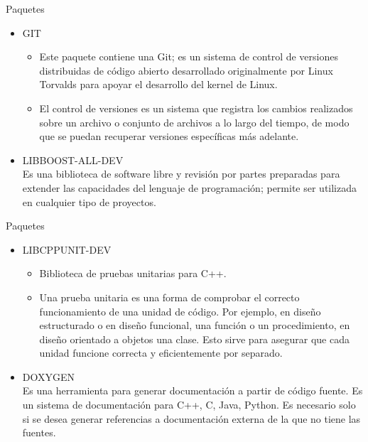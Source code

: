 \begin{frame}{Paquetes}
  \begin{itemize}
  \item {GIT\\}
  \begin{itemize}
    \item
    {Este paquete contiene una Git; es un sistema de control de versiones distribuidas de código abierto desarrollado originalmente por Linux Torvalds para apoyar el desarrollo del kernel de Linux.}
    \item
    {El control de versiones es un sistema que registra los cambios realizados sobre un archivo o conjunto de archivos a lo largo del tiempo, de modo que se puedan recuperar versiones específicas más adelante.}
    \end{itemize}
  \item {LIBBOOST-ALL-DEV\\}
  {Es una biblioteca de software libre y revisión por partes preparadas para extender las capacidades del lenguaje de programación; permite ser utilizada en cualquier tipo de proyectos.}
  \end{itemize}
\end{frame}


\begin{frame}{Paquetes}
  \begin{itemize}
  \item {LIBCPPUNIT-DEV\\}
  \begin{itemize}
    \item
    {Biblioteca de pruebas unitarias para C++.}
    \item
    {Una prueba unitaria es una forma de comprobar el correcto
funcionamiento de una unidad de código. Por ejemplo, en diseño
estructurado o en diseño funcional, una función o un procedimiento,
en diseño orientado a objetos una clase. Esto sirve para asegurar que
cada unidad funcione correcta y eficientemente por separado.}
    \end{itemize}
  \item {DOXYGEN\\}
  {Es una herramienta para generar documentación a partir de código fuente. Es un sistema de documentación para C++, C, Java, Python. Es necesario solo si se desea generar referencias a documentación externa de la que no tiene las fuentes.}
  \end{itemize}
\end{frame}


